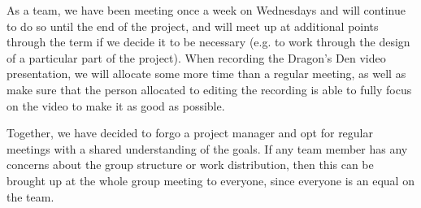 \documentclass{article}
\begin{document}
As a team, we have been meeting once a week on Wednesdays and will continue to do 
so until the end of the project, and will meet up at additional points through the term if we decide it to be necessary 
(e.g. to work through the design of a particular part of the project). When recording the Dragon's 
Den video presentation, we will allocate some more time than a regular meeting, as well as make sure that 
the person allocated to editing the recording is able to fully focus on the video to make it as good as possible. 

Together, we have decided to forgo a project manager and opt for regular meetings 
with a shared understanding of the goals. If any team member has any concerns about the group 
structure or work distribution, then this can be brought up at the whole group meeting 
to everyone, since everyone is an equal on the team.
\end{document}
